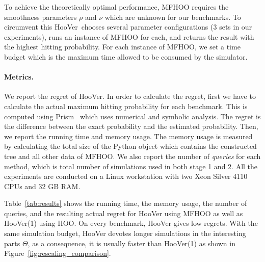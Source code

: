 \documentclass[11pt]{article}
\theoremstyle{definition}
\newcommand{\sayan}[1]{\textcolor{blue}{#1}}
\newcommand{\toolname}{{{\sf HooVer}\xspace}}
\begin{document}
To achieve the theoretically optimal performance, MFHOO  requires the smoothness parameters $\rho$ and $\nu$ which are unknown for our benchmarks. To circumvent this \toolname\ chooses  several parameter configurations ($3$ sets in our experiments), runs an instance of MFHOO for each, and  returns the result with the highest hitting probability. For each instance of MFHOO, we set a time budget which is the maximum time allowed to be consumed by the simulator.


\paragraph{Metrics.}
We report the regret of \toolname. In order to calculate the regret, first we have to calculate the actual maximum hitting probability for each benchmark. This is computed using Prism~\cite{HKNP06} which uses numerical and symbolic analysis. The regret is the difference between the exact probability and the estimated probability. Then, we report the running time and memory usage. The memory usage is measured by calculating the total size of the Python object which contains the constructed tree and all other data of MFHOO. We also report the number of {\em queries\/} for each method, which is total number of simulations used in both stage 1 and 2.
%
All the experiments are conducted on a Linux workstation with two Xeon Silver 4110 CPUs and 32 GB RAM.

Table~\ref{tab:results} shows the running time, the memory usage, the number of queries, and the resulting actual regret for \toolname{} using MFHOO as well as \toolname(1) using HOO.
%
%
On every benchmark, \toolname{} gives low regrets.
%
With the same simulation budget, \toolname{} devotes longer simulations in the interesting parts $\Theta$, as a consequence, it is usually faster than \toolname(1) as shown in Figure~\ref{fig:rescaling_comparison}.
%
%
\end{document}
